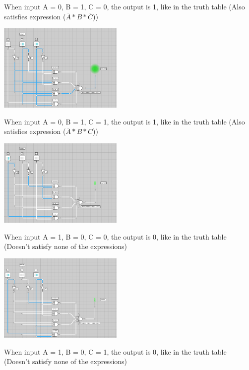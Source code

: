 \documentclass{article}
\begin{document}
    \small When input A = 0, B = 1, C = 0, the output is 1, like in the truth table (Also satisfies expression ($\overline{A} * B * \overline{C}$))

    \includegraphics*[width=0.45\textwidth]{circuit4.png}

    \small When input A = 0, B = 1, C = 1, the output is 1, like in the truth table (Also satisfies expression ($\overline{A} * B * C$))

    \vspace*{0.1in}

    \includegraphics*[width=0.45\textwidth]{circuit5.png}

    \small When input A = 1, B = 0, C = 0, the output is 0, like in the truth table (Doesn't satisfy none of the expressions)

    \vspace*{0.1in}

    \includegraphics*[width=0.45\textwidth]{circuit6.png}

    \small When input A = 1, B = 0, C = 1, the output is 0, like in the truth table (Doesn't satisfy none of the expressions)
    
    \newpage

    \vspace*{0.1in}
\end{document}
